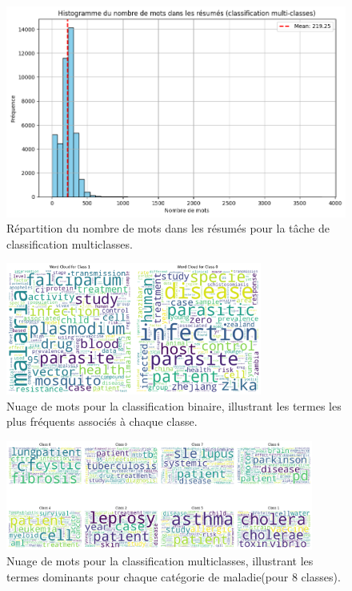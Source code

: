 \documentclass[12pt]{report}
\begin{document}
\begin{figure}[H]
\centering
\includegraphics[width=0.5\linewidth]{word_distribution_per_abstract_multi_class.png}
\caption{Répartition du nombre de mots dans les résumés pour la tâche de classification multiclasses.}
\label{fig:word_distribution_multi_class}
\end{figure}

\begin{figure}[H]
\centering
\includegraphics[width=0.75\textwidth]{binary_word_cloud.png}
\caption{Nuage de mots pour la classification binaire, illustrant les termes les plus fréquents associés à chaque classe.}
\label{fig:binary_word_cloud}
\end{figure}

\begin{figure}[H]
\centering
\includegraphics[width=0.9\textwidth]{multi_word_cloud.png}
\caption{Nuage de mots pour la classification multiclasses, illustrant les termes dominants pour chaque catégorie de maladie(pour 8 classes).}
\label{fig:multi_word_cloud}
\end{figure}
\end{document}
